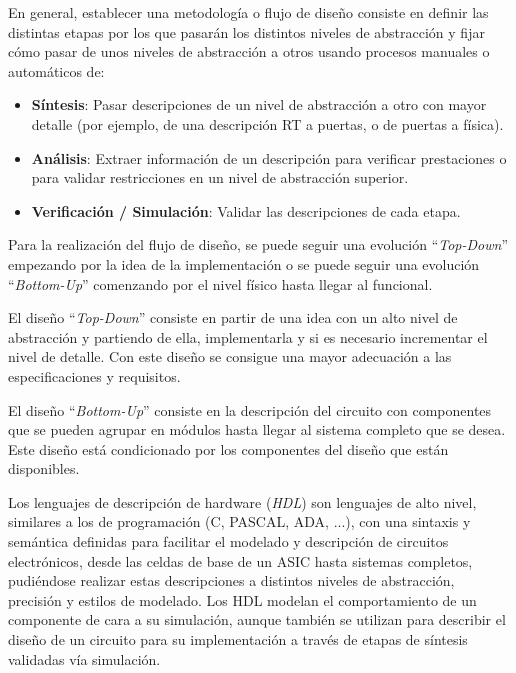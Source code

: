 En general, establecer una metodología o flujo de diseño consiste en definir las distintas etapas por los que pasarán los distintos niveles 
de abstracción y fijar cómo pasar de unos niveles de abstracción a otros usando procesos manuales o automáticos de:

\begin{itemize}
    \item \textbf{Síntesis}: Pasar descripciones de un nivel de abstracción a otro con mayor detalle (por ejemplo, de una descripción RT a 
    puertas, o de puertas a física).
    \item \textbf{Análisis}: Extraer información de un descripción para verificar prestaciones o para validar restricciones en un nivel 
    de abstracción superior.
    \item \textbf{Verificación / Simulación}: Validar las descripciones de cada etapa.
\end{itemize}

Para la realización del flujo de diseño, se puede seguir una evolución ``\textit{Top-Down}'' empezando por la idea de la implementación 
o se puede seguir una evolución ``\textit{Bottom-Up}'' comenzando por el nivel físico hasta llegar al funcional.

El diseño ``\textit{Top-Down}'' consiste en partir de una idea con un alto nivel de abstracción y partiendo de ella, implementarla y si es necesario 
incrementar el nivel de detalle. Con este diseño se consigue una mayor adecuación a las especificaciones y requisitos.

El diseño ``\textit{Bottom-Up}'' consiste en la descripción del circuito con componentes que se pueden agrupar en módulos hasta llegar al 
sistema completo que se desea. Este diseño está condicionado por los componentes del diseño que están disponibles.

Los lenguajes de descripción de hardware (\textit{HDL}) son lenguajes de alto nivel, similares a los de programación (C, PASCAL, ADA, ...), con una sintaxis y semántica 
definidas para facilitar el modelado y descripción de circuitos electrónicos, desde las celdas de base de un ASIC hasta sistemas completos, pudiéndose 
realizar estas descripciones a distintos niveles de abstracción, precisión y estilos de modelado.
Los HDL modelan el comportamiento de un componente de cara a su simulación, aunque también se utilizan para describir el diseño de un circuito para
su implementación a través de etapas de síntesis validadas vía simulación.

